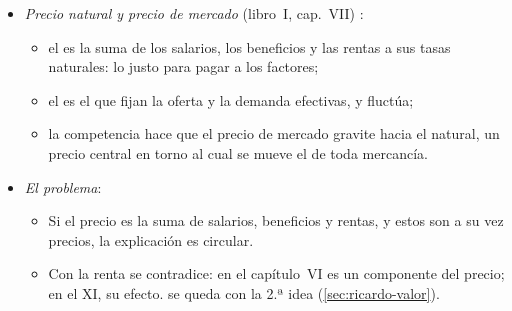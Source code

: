 \documentclass[11pt]{article}
\begin{document}
\begin{itemize}
\begin{itemize}
  \end{itemize}
\item \emph{Precio natural y precio de mercado} (libro~I, cap.~VII) :
  \begin{itemize}
  \item el  es la suma de los salarios, los beneficios y las rentas a sus tasas naturales: lo justo para pagar a los factores;
  \item el  es el que fijan la oferta y la demanda efectivas, y fluctúa;
  \item la competencia hace que el precio de mercado gravite hacia el natural, un precio central en torno al cual se mueve el de toda mercancía.
  \end{itemize}
\item \emph{El problema}:
  \begin{itemize}
  \item Si el precio es la suma de salarios, beneficios y rentas, y estos son a su vez precios, la explicación es circular.
  \item Con la renta  se contradice: en el capítulo~VI es un componente del precio; en el XI, su efecto.  se queda con la 2.ª idea (\ref{sec:ricardo-valor}).
  \end{itemize}
\end{itemize}
\end{document}
